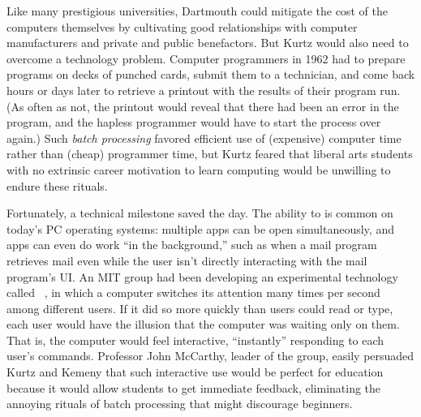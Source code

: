 Like many prestigious universities, Dartmouth could mitigate the cost of
the computers themselves by cultivating good relationships with
computer manufacturers and private and public benefactors.
But Kurtz would also need to overcome a technology problem.
Computer programmers in 1962 had to prepare programs on decks of punched cards,
submit them to a technician,
and come back hours or days later to retrieve a printout with
the results of their program run.  (As often as not, the printout
would reveal that there had been an error in the program, and the
hapless programmer would have to start the process over again.)
Such \emph{batch processing} favored efficient use of (expensive) computer time rather
than (cheap) programmer time,
but Kurtz feared that liberal arts students with no
extrinsic career motivation to learn computing would be unwilling
to endure these rituals.

Fortunately, a technical milestone saved the day.
The ability to  is common on today's
PC operating systems: multiple apps can be open
simultaneously, and apps can even do work ``in the background,''
such as when a mail program
retrieves mail even while the user isn't
directly interacting with the mail program's UI.
An MIT group had been developing an experimental technology called
~\cite{corbato62timesharing}, in which a computer
switches its attention many times per second among 
different users.
If it did so more quickly than
users could read or type, each user would have the illusion that the computer
was waiting only on them.  That is, the computer would feel
interactive, ``instantly'' responding to each user's commands.
Professor John McCarthy, leader of the group, easily persuaded Kurtz
and Kemeny that such interactive 
use would be perfect for education because it would allow
students to get
immediate feedback, eliminating the annoying rituals of batch
processing that might discourage beginners.


